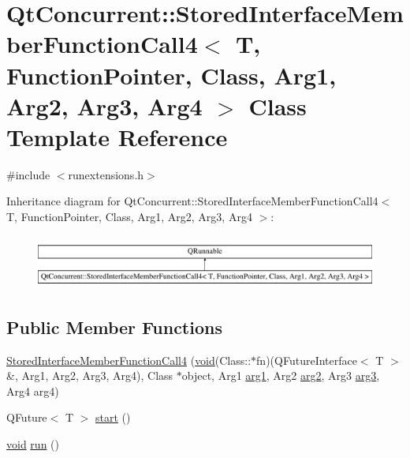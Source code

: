 \hypertarget{class_qt_concurrent_1_1_stored_interface_member_function_call4}{\section{Qt\-Concurrent\-:\-:Stored\-Interface\-Member\-Function\-Call4$<$ T, Function\-Pointer, Class, Arg1, Arg2, Arg3, Arg4 $>$ Class Template Reference}
\label{class_qt_concurrent_1_1_stored_interface_member_function_call4}
}


{\ttfamily \#include $<$runextensions.\-h$>$}

Inheritance diagram for Qt\-Concurrent\-:\-:Stored\-Interface\-Member\-Function\-Call4$<$ T, Function\-Pointer, Class, Arg1, Arg2, Arg3, Arg4 $>$\-:\begin{figure}[H]
\begin{center}
\leavevmode
\includegraphics[height=1.774960cm]{class_qt_concurrent_1_1_stored_interface_member_function_call4}
\end{center}
\end{figure}
\subsection*{Public Member Functions}
\begin{DoxyCompactItemize}
\item 
\hyperlink{class_qt_concurrent_1_1_stored_interface_member_function_call4_aa7a9e1003d2d3b79fed31c04a04ecabb}{Stored\-Interface\-Member\-Function\-Call4} (\hyperlink{group___u_a_v_objects_plugin_ga444cf2ff3f0ecbe028adce838d373f5c}{void}(Class\-::$\ast$fn)(Q\-Future\-Interface$<$ T $>$ \&, Arg1, Arg2, Arg3, Arg4), Class $\ast$object, Arg1 \hyperlink{glext_8h_a4b247ab422408c1761a36f9034c2585b}{arg1}, Arg2 \hyperlink{glext_8h_a5aee5a44bf92a9837fea48e41ef0df57}{arg2}, Arg3 \hyperlink{glext_8h_a525a52cc20e1aa70741e5c7dae172f25}{arg3}, Arg4 arg4)
\item 
Q\-Future$<$ T $>$ \hyperlink{class_qt_concurrent_1_1_stored_interface_member_function_call4_a361322fcb4067f0acfe514be8d1fcbeb}{start} ()
\item 
\hyperlink{group___u_a_v_objects_plugin_ga444cf2ff3f0ecbe028adce838d373f5c}{void} \hyperlink{class_qt_concurrent_1_1_stored_interface_member_function_call4_a157bf2ef24bb8e9daa09b3ff78b0ea95}{run} ()
\end{DoxyCompactItemize}


